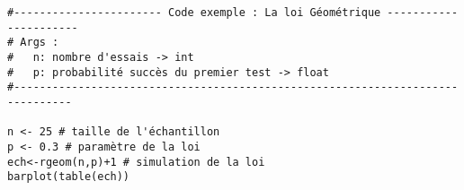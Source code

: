\begin{lstlisting}[caption=Code exemple : Simulation de la loi géométrique, label=lst:geometric_distribution]  
#----------------------- Code exemple : La loi Géométrique ----------------------
# Args :
#   n: nombre d'essais -> int
#   p: probabilité succès du premier test -> float
#-------------------------------------------------------------------------------
    
n <- 25 # taille de l'échantillon
p <- 0.3 # paramètre de la loi 
ech<-rgeom(n,p)+1 # simulation de la loi
barplot(table(ech))
\end{lstlisting}

